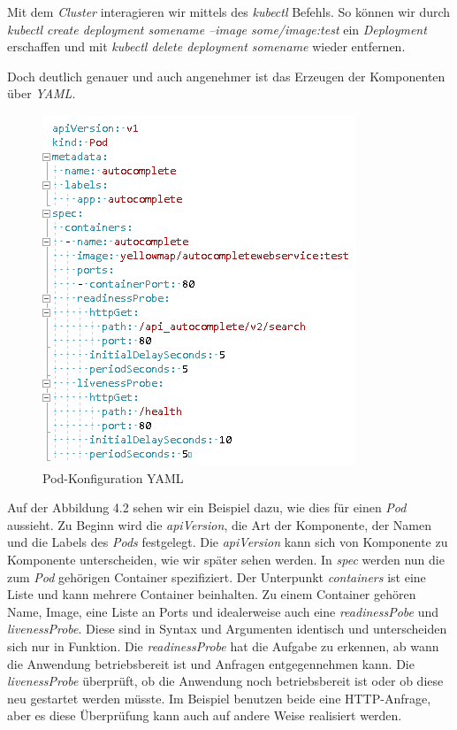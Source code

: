\documentclass[12pt,a4paper]{scrartcl}
\begin{document}
Mit dem \emph{Cluster} interagieren wir mittels des \emph{kubectl} Befehls. So können wir durch \emph{kubectl create deployment somename --image some/image:test} ein \emph{Deployment} erschaffen und mit \emph{kubectl delete deployment somename} wieder entfernen. 

Doch deutlich genauer und auch angenehmer ist das Erzeugen der Komponenten über \emph{YAML}. 

\begin{figure}[h!]
	\centering
	\includegraphics[scale=1]{KubeYmlPod.png}
	\caption[Screenshot]{Pod-Konfiguration YAML}
\end{figure}

Auf der Abbildung 4.2 sehen wir ein Beispiel dazu, wie dies für einen \emph{Pod} aussieht. Zu Beginn wird die \emph{apiVersion}, die Art der Komponente, der Namen und die Labels des \emph{Pods} festgelegt. Die \emph{apiVersion} kann sich von Komponente zu Komponente unterscheiden, wie wir später sehen werden. In \emph{spec} werden nun die zum \emph{Pod} gehörigen Container spezifiziert. Der Unterpunkt \emph{containers} ist eine Liste und kann mehrere Container beinhalten. Zu einem Container gehören Name, Image, eine Liste an Ports und idealerweise auch eine \emph{readinessPobe} und \emph{livenessProbe}. Diese sind in Syntax und Argumenten identisch und unterscheiden sich nur in Funktion. Die \emph{readinessProbe} hat die Aufgabe zu erkennen, ab wann die Anwendung betriebsbereit ist und Anfragen entgegennehmen kann. Die \emph{livenessProbe} überprüft, ob die Anwendung noch betriebsbereit ist oder ob diese neu gestartet werden müsste. Im Beispiel benutzen beide eine HTTP-Anfrage, aber es diese Überprüfung kann auch auf andere Weise realisiert werden.
\end{document}
